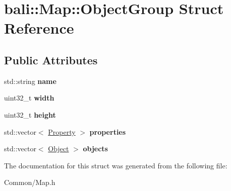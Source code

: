 \hypertarget{structbali_1_1_map_1_1_object_group}{\section{bali\-:\-:Map\-:\-:Object\-Group Struct Reference}
\label{structbali_1_1_map_1_1_object_group}
}
\subsection*{Public Attributes}
\begin{DoxyCompactItemize}
\item 
\hypertarget{structbali_1_1_map_1_1_object_group_a42d9d6cd6f69dae9fe943002777e12d9}{std\-::string {\bfseries name}}\label{structbali_1_1_map_1_1_object_group_a42d9d6cd6f69dae9fe943002777e12d9}

\item 
\hypertarget{structbali_1_1_map_1_1_object_group_ad260b080ec45ea17ca6e754e64a3a1bf}{uint32\-\_\-t {\bfseries width}}\label{structbali_1_1_map_1_1_object_group_ad260b080ec45ea17ca6e754e64a3a1bf}

\item 
\hypertarget{structbali_1_1_map_1_1_object_group_a1076b11220c8b20b90f47b343d197442}{uint32\-\_\-t {\bfseries height}}\label{structbali_1_1_map_1_1_object_group_a1076b11220c8b20b90f47b343d197442}

\item 
\hypertarget{structbali_1_1_map_1_1_object_group_a20429fa089fe8278a8b613904fffeef9}{std\-::vector$<$ \hyperlink{structbali_1_1_map_1_1_property}{Property} $>$ {\bfseries properties}}\label{structbali_1_1_map_1_1_object_group_a20429fa089fe8278a8b613904fffeef9}

\item 
\hypertarget{structbali_1_1_map_1_1_object_group_a3c37ed5911f48904e7c189c57fbf6c92}{std\-::vector$<$ \hyperlink{structbali_1_1_map_1_1_object}{Object} $>$ {\bfseries objects}}\label{structbali_1_1_map_1_1_object_group_a3c37ed5911f48904e7c189c57fbf6c92}

\end{DoxyCompactItemize}


The documentation for this struct was generated from the following file\-:\begin{DoxyCompactItemize}
\item 
Common/Map.\-h\end{DoxyCompactItemize}
